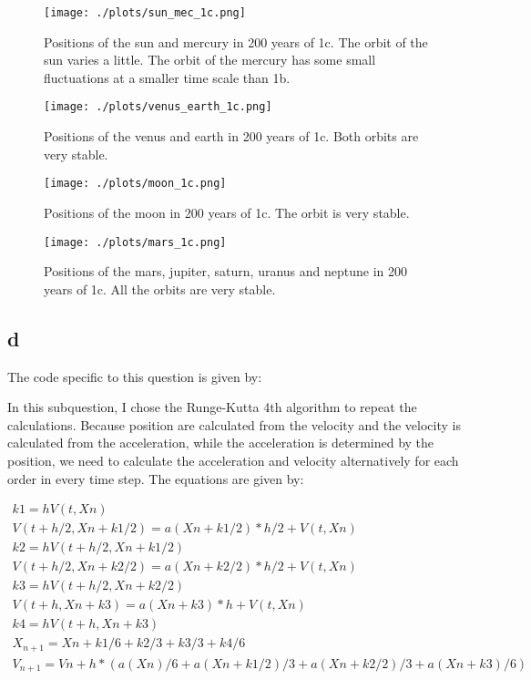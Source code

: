 \begin{figure}[h!]
  \centering
  \texttt{[image: ./plots/sun\_mec\_1c.png]}
  \caption{Positions of the sun and mercury in 200 years of 1c. The orbit of the sun varies a little. The orbit of the mercury has some small fluctuations at a smaller time scale than 1b. }
  \label{fig6}
\end{figure}

\begin{figure}[h!]
  \centering
  \texttt{[image: ./plots/venus\_earth\_1c.png]}
  \caption{Positions of the venus and earth in 200 years of 1c. Both orbits are very stable.}
  \label{fig7}
\end{figure}

\begin{figure}[h!]
  \centering
  \texttt{[image: ./plots/moon\_1c.png]}
  \caption{Positions of the moon in 200 years of 1c. The orbit is very stable.}
  \label{fig8}
\end{figure}

\begin{figure}[h!]
  \centering
  \texttt{[image: ./plots/mars\_1c.png]}
  \caption{Positions of the mars, jupiter, saturn, uranus and neptune in 200 years of 1c. All the orbits are very stable.}
  \label{fig9}
\end{figure}

\clearpage
\subsection{d}
The code specific to this question is given by:


In this subquestion, I chose the Runge-Kutta 4th algorithm to repeat the calculations. Because position are calculated from the velocity and the velocity is calculated from the acceleration, while the acceleration is determined by the position, we need to calculate the acceleration and velocity alternatively for each order in every time step. The equations are given by:

\begin{equation}
  \label{eq:3}
  \begin{aligned}
    k1 = hV(t,Xn)\\
    V(t+h/2,Xn+k1/2) = a(Xn+k1/2)*h/2 + V(t,Xn)\\
    k2 = hV(t+h/2,Xn+k1/2)\\
    V(t+h/2,Xn+k2/2) = a(Xn+k2/2)*h/2 + V(t,Xn)\\
    k3 = hV(t+h/2,Xn+k2/2)\\
    V(t+h,Xn+k3) = a(Xn+k3)*h + V(t,Xn)\\
    k4 = hV(t+h,Xn+k3)\\
    X_{n+1} = Xn + k1/6 + k2/3 + k3/3 + k4/6\\
    V_{n+1} = Vn + h*(a(Xn)/6 + a(Xn+k1/2)/3 + a(Xn+k2/2)/3 + a(Xn+k3)/6)\\
  \end{aligned}
\end{equation}

